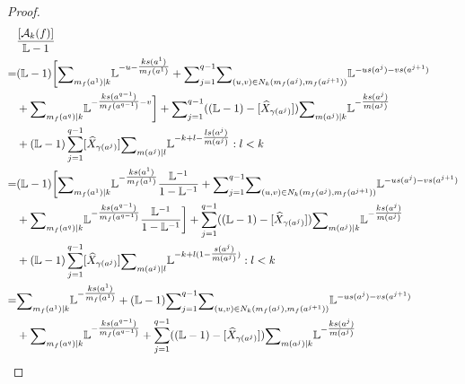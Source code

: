 \documentclass[12pt,a4paper,leqno]{amsart}
\theoremstyle{definition}
\begin{document}
\begin{proof}
{\small
\begin{align*}
&\frac{[\mathcal A_k(f)]}{{\mathbb{L}}-1}
\\
=&
({\mathbb{L}}-1)
\biggl[{\mathop{\textrm{\scriptsize $\mathop\sum$}}}_{m_f(a^1)|k} {\mathbb{L}}^{-u-\tfrac{ks(a^1)}{m_f(a^1)}}
+{\mathop{\textrm{\scriptsize $\mathop\sum$}}}_{j=1}^{q-1}
{\mathop{\textrm{\scriptsize $\mathop\sum$}}}_{(u,v)\in N_k(m_f(a^j),m_f(a^{j+1}))}{\mathbb{L}}^{-us(a^j)-vs(a^{j+1})}
\\
&+{\mathop{\textrm{\scriptsize $\mathop\sum$}}}_{m_f(a^q)|k} {\mathbb{L}}^{-\tfrac{ks(a^{q-1})}{m_f(a^{q-1})}-v}\biggr]
+{\mathop{\textrm{\scriptsize $\mathop\sum$}}}_{j=1}^{q-1}(({\mathbb{L}}-1)-[\widehat{X}_{\gamma(a^j)}])
{\mathop{\textrm{\scriptsize $\mathop\sum$}}}_{m(a^j)|k}{\mathbb{L}}^{-\tfrac{ks(a^j)}{m(a^j)}}\\
&+({\mathbb{L}}-1)\sum_{j=1}^{q-1}[\widehat{X}_{\gamma(a^j)}]
{\mathop{\textrm{\scriptsize $\mathop\sum$}}}_{m(a^j)|l}{\mathbb{L}}^{-k+l-\tfrac{ls(a^j)}{m(a^j)}}: l<k\\
=&
({\mathbb{L}}-1)\biggl[
{\mathop{\textrm{\scriptsize $\mathop\sum$}}}_{m_f(a^1)|k} {\mathbb{L}}^{-\tfrac{ks(a^1)}{m_f(a^1)}}
\frac{{\mathbb{L}}^{-1}}{1-{\mathbb{L}}^{-1}}
+{\mathop{\textrm{\scriptsize $\mathop\sum$}}}_{j=1}^{q-1}
{\mathop{\textrm{\scriptsize $\mathop\sum$}}}_{(u,v)\in N_k(m_f(a^j),m_f(a^{j+1}))}{\mathbb{L}}^{-us(a^j)-vs(a^{j+1})}\\
&+{\mathop{\textrm{\scriptsize $\mathop\sum$}}}_{m_f(a^q)|k} {\mathbb{L}}^{-\tfrac{ks(a^{q-1})}{m_f(a^{q-1})}}
\frac{{\mathbb{L}}^{-1}}{1-{\mathbb{L}}^{-1}}\biggr]
+\sum_{j=1}^{q-1}(({\mathbb{L}}-1)-[\widehat{X}_{\gamma(a^j)}])
{\mathop{\textrm{\scriptsize $\mathop\sum$}}}_{m(a^j)|k}{\mathbb{L}}^{-\tfrac{ks(a^j)}{m(a^j)}}\\
&+({\mathbb{L}}-1)\sum_{j=1}^{q-1}[\widehat{X}_{\gamma(a^j)}]
{\mathop{\textrm{\scriptsize $\mathop\sum$}}}_{m(a^j)|l}{\mathbb{L}}^{-k+l(1-\tfrac{s(a^j)}{m(a^j)})}: l<k
\\
=&
{\mathop{\textrm{\scriptsize $\mathop\sum$}}}_{m_f(a^1)|k} {\mathbb{L}}^{-\tfrac{ks(a^1)}{m_f(a^1)}}
+({\mathbb{L}}-1){\mathop{\textrm{\scriptsize $\mathop\sum$}}}_{j=1}^{q-1}
{\mathop{\textrm{\scriptsize $\mathop\sum$}}}_{(u,v)\in N_k(m_f(a^j),m_f(a^{j+1}))}{\mathbb{L}}^{-us(a^j)-vs(a^{j+1})}\\
&+{\mathop{\textrm{\scriptsize $\mathop\sum$}}}_{m_f(a^q)|k} {\mathbb{L}}^{-\tfrac{ks(a^{q-1})}{m_f(a^{q-1})}}
+\sum_{j=1}^{q-1}(({\mathbb{L}}-1)-[\widehat{X}_{\gamma(a^j)}])
{\mathop{\textrm{\scriptsize $\mathop\sum$}}}_{m(a^j)|k}{\mathbb{L}}^{-\tfrac{ks(a^j)}{m(a^j)}}\\

\end{align*}}
\end{proof}
\end{document}
